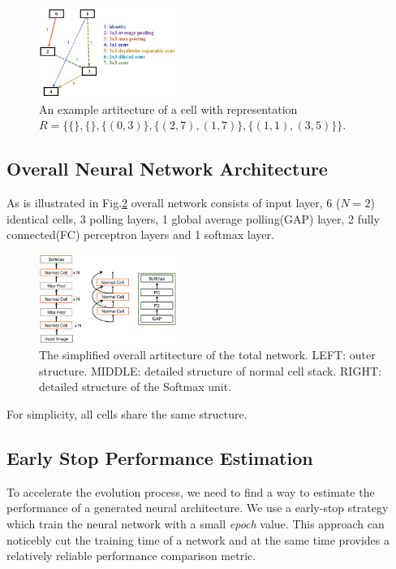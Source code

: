\documentclass[conference]{IEEEtran}
\begin{document}
  \begin{figure}[H]
 	\centering
 	\includegraphics[width=0.4\textwidth]{figures/cellStruct.png}
   \caption{An example artitecture of a cell with representation $R=\{\{\},\{\},\{(0,3)\},\{(2,7),(1,7)\},\{(1,1),(3,5)\}\}$.}\label{fig:digit}
   \label{f_artc}
  \end{figure}

  \subsection{Overall Neural Network Architecture}
  As is illustrated in Fig.\ref{total_artc} overall network consists of input layer, 6 ($N = 2$) identical cells, 3 polling layers, 1 global average polling(GAP) layer, 2 fully connected(FC) perceptron layers and 1 softmax layer. 

  \begin{figure}[H]
 	\centering
 	\includegraphics[width=0.4\textwidth]{figures/overallStruct.png}
   \caption{The simplified overall artitecture of the total network. LEFT: outer structure. MIDDLE: detailed structure of normal cell stack. RIGHT: detailed structure of the Softmax unit.}\label{fig:digit}
   \label{total_artc}
  \end{figure}

  For simplicity, all cells share the same structure. 

  \subsection{Early Stop Performance Estimation}

  To accelerate the evolution process, we need to find a way to estimate the performance of a generated neural architecture. We use a early-stop strategy which train the neural network with a small \emph{epoch} value. This approach can noticebly cut the training time of a network and at the same time provides a relatively reliable performance comparison metric.
\end{document}
